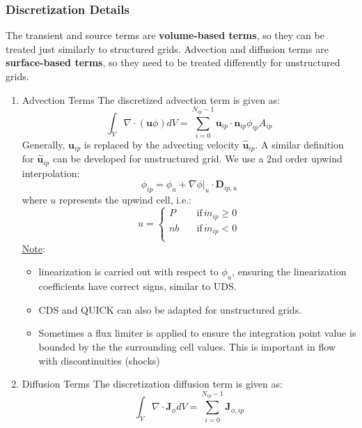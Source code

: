 \documentclass[11pt]{article}
\begin{document}
\subsubsection{Discretization Details}
\label{sec:orgbea7bce}
The transient and source terms are \textbf{volume-based terms}, so they can be treated just similarly to structured
grids. Advection and diffusion terms are \textbf{surface-based terms}, so they need to be treated differently
for unstructured grids.
\begin{enumerate}
\item Advection Terms
\label{sec:org14047bc}
The discretized advection term is given as:
\begin{equation*}
\int_{V} \nabla \cdot (\textbf{u}\phi)dV = \sum_{i=0}^{N_{ip}-1} \textbf{u}_{ip}
\cdot \textbf{n}_{ip} \phi_{ip} A_{ip}
\end{equation*}
Generally, \(\textbf{u}_{ip}\) is replaced by the advecting velocity \(\hat{\textbf{u}}_{ip}\).
A similar definition for \(\hat{\textbf{u}}_{ip}\) can be developed for unstructured grid. We use a 2nd order
upwind interpolation:
\begin{equation*}
\phi_{ip} = \phi_u + \nabla \phi \biggr\rvert_u \cdot \textbf{D}_{ip,u}
\end{equation*}
where \(u\) represents the upwind cell, i.e.:
\begin{equation*}
u=\begin{cases}
P \quad &\text{if} \, \dot{m}_{ip} \geq 0 \\
nb \quad &\text{if} \, \dot{m}_{ip} < 0  \\
\end{cases}
\end{equation*}
\uline{Note}:
\begin{itemize}
\item linearization is carried out with respect to \(\phi_u\), ensuring the linearization coefficients have
correct signs, similar to UDS.
\item CDS and QUICK can also be adapted for unstructured grids.
\item Sometimes a flux limiter is applied to ensure the integration point value is bounded by the
the surrounding cell values. This is important in flow with discontinuities (shocks)
\end{itemize}
\item Diffusion Terms
\label{sec:org7c55c55}
The discretization diffusion term is given as:
\begin{equation*}
\int_{V} \nabla \cdot \textbf{J}_\phi dV = \sum_{i = 0}^{N_{ip}-1} \textbf{J}_{\phi,ip}

\end{equation*}
\end{enumerate}
\end{document}
